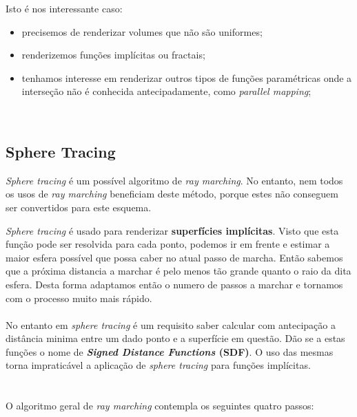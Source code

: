 Isto é nos interessante caso:
\begin{itemize}
    \item precisemos de renderizar volumes que não são uniformes;
    \item renderizemos funções implícitas ou fractais;
    \item tenhamos interesse em renderizar outros tipos de funções paramétricas onde a interseção não é conhecida antecipadamente, como \textit{parallel mapping};
\end{itemize}

\\

\subsection{Sphere Tracing}
\textit{Sphere tracing} é um possível algoritmo de \textit{ray marching}. No entanto, nem todos os usos de \textit{ray marching} beneficiam deste método, porque estes não conseguem ser convertidos para este esquema.

\textit{Sphere tracing} é usado para renderizar \textbf{superfícies implícitas}.
Visto que esta função pode ser resolvida para cada ponto, podemos ir em frente e estimar a maior esfera possível que possa caber no atual passo de marcha. Então sabemos que a próxima distancia a marchar é pelo menos tão grande quanto o raio da dita esfera. Desta forma adaptamos então o numero de passos a marchar e tornamos com o processo muito mais rápido.\\

\\

No entanto em \textit{sphere tracing} é um requisito saber calcular com antecipação a distância minima entre um dado ponto e a superfície em questão. Dão se a estas funções o nome de \textbf{\textit{Signed Distance Functions} (SDF)}.
O uso das mesmas torna impraticável a aplicação de \textit{sphere tracing} para funções implícitas. \\

\\
\\




O algoritmo geral de \textit{ray marching} contempla os seguintes quatro passos:

